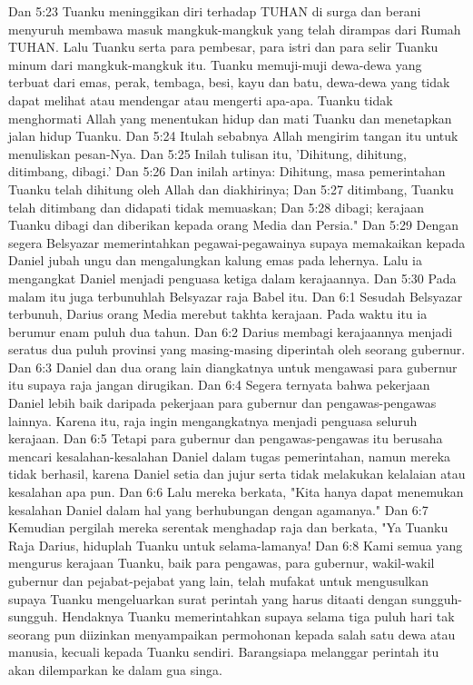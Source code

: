 Dan 5:23  Tuanku meninggikan diri terhadap TUHAN di surga dan berani menyuruh membawa masuk mangkuk-mangkuk yang telah dirampas dari Rumah TUHAN. Lalu Tuanku serta para pembesar, para istri dan para selir Tuanku minum dari mangkuk-mangkuk itu. Tuanku memuji-muji dewa-dewa yang terbuat dari emas, perak, tembaga, besi, kayu dan batu, dewa-dewa yang tidak dapat melihat atau mendengar atau mengerti apa-apa. Tuanku tidak menghormati Allah yang menentukan hidup dan mati Tuanku dan menetapkan jalan hidup Tuanku.
Dan 5:24  Itulah sebabnya Allah mengirim tangan itu untuk menuliskan pesan-Nya.
Dan 5:25  Inilah tulisan itu, 'Dihitung, dihitung, ditimbang, dibagi.'
Dan 5:26  Dan inilah artinya: Dihitung, masa pemerintahan Tuanku telah dihitung oleh Allah dan diakhirinya;
Dan 5:27  ditimbang, Tuanku telah ditimbang dan didapati tidak memuaskan;
Dan 5:28  dibagi; kerajaan Tuanku dibagi dan diberikan kepada orang Media dan Persia."
Dan 5:29  Dengan segera Belsyazar memerintahkan pegawai-pegawainya supaya memakaikan kepada Daniel jubah ungu dan mengalungkan kalung emas pada lehernya. Lalu ia mengangkat Daniel menjadi penguasa ketiga dalam kerajaannya.
Dan 5:30  Pada malam itu juga terbunuhlah Belsyazar raja Babel itu.
Dan 6:1  Sesudah Belsyazar terbunuh, Darius orang Media merebut takhta kerajaan. Pada waktu itu ia berumur enam puluh dua tahun.
Dan 6:2  Darius membagi kerajaannya menjadi seratus dua puluh provinsi yang masing-masing diperintah oleh seorang gubernur.
Dan 6:3  Daniel dan dua orang lain diangkatnya untuk mengawasi para gubernur itu supaya raja jangan dirugikan.
Dan 6:4  Segera ternyata bahwa pekerjaan Daniel lebih baik daripada pekerjaan para gubernur dan pengawas-pengawas lainnya. Karena itu, raja ingin mengangkatnya menjadi penguasa seluruh kerajaan.
Dan 6:5  Tetapi para gubernur dan pengawas-pengawas itu berusaha mencari kesalahan-kesalahan Daniel dalam tugas pemerintahan, namun mereka tidak berhasil, karena Daniel setia dan jujur serta tidak melakukan kelalaian atau kesalahan apa pun.
Dan 6:6  Lalu mereka berkata, "Kita hanya dapat menemukan kesalahan Daniel dalam hal yang berhubungan dengan agamanya."
Dan 6:7  Kemudian pergilah mereka serentak menghadap raja dan berkata, "Ya Tuanku Raja Darius, hiduplah Tuanku untuk selama-lamanya!
Dan 6:8  Kami semua yang mengurus kerajaan Tuanku, baik para pengawas, para gubernur, wakil-wakil gubernur dan pejabat-pejabat yang lain, telah mufakat untuk mengusulkan supaya Tuanku mengeluarkan surat perintah yang harus ditaati dengan sungguh-sungguh. Hendaknya Tuanku memerintahkan supaya selama tiga puluh hari tak seorang pun diizinkan menyampaikan permohonan kepada salah satu dewa atau manusia, kecuali kepada Tuanku sendiri. Barangsiapa melanggar perintah itu akan dilemparkan ke dalam gua singa.
